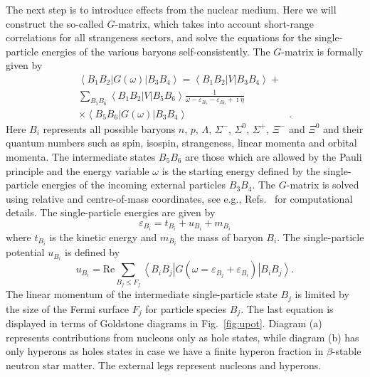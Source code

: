 \begin{multicols}{2}
The next step is to introduce effects from the nuclear medium. 
Here we will construct the so-called $G$-matrix, which
takes into account short-range correlations for all strangeness
sectors, and solve the equations for the single-particle energies 
of the various baryons self-consistently.
The $G$-matrix is formally given by 
\begin{eqnarray}
   \left\langle B_1B_2\right |G(\omega)\left | B_3B_4 \right\rangle=
   \left\langle B_1B_2\right |V\left | B_3B_4 \right\rangle+&\nonumber\\
   \sum_{B_5B_6}\left\langle B_1B_2\right |V\left | B_5B_6 \right\rangle
   \frac{1}{\omega-\varepsilon_{B_5}-\varepsilon_{B_6}+ \imath\eta}&\nonumber\\
   \times\left\langle B_5B_6\right |G(\omega)\left | B_3B_4 \right\rangle&.
   \label{eq:gmatrix}
\end{eqnarray}
Here $B_i$ represents all possible baryons $n$, $p$, $\Lambda$, $\Sigma^{-}$,
$\Sigma^0$, $\Sigma^+$, $\Xi^-$ and $\Xi^0$ and their quantum numbers
such as spin, isospin, strangeness, linear momenta and orbital momenta.
The intermediate states $B_5B_6$ are those which are allowed by
the Pauli principle and the energy variable $\omega$ is the starting energy
defined by the single-particle energies 
of the incoming external particles $B_3B_4$.
The $G$-matrix is solved using relative and centre-of-mass coordinates,
see e.g., Refs.~\cite{sl99,isaac99} for computational details.
The single-particle energies are given by
\begin{equation}
      \varepsilon_{B_i}=t_{B_i} + u_{B_i} +m_{B_i}
       \label{eq:spenergy}
\end{equation} 
where $t_{B_i}$ is the kinetic energy and $m_{B_i}$ 
the mass of baryon ${B_i}$. The
single-particle potential $u_{B_i}$ is defined by  
\begin{equation} 
       u_{B_i}=\mathrm{Re} \sum_{B_j\leq F_j}
       \left\langle B_iB_j\right |
       G(\omega=\varepsilon_{B_j}+\varepsilon_{B_i})
       \left | B_iB_j \right\rangle.
\end{equation}
The linear momentum of the intermediate 
single-particle state $B_j$ is limited by the size of the Fermi surface 
$F_j$ for particle species $B_j$. 
The last equation is displayed in terms of Goldstone diagrams 
in Fig.\ \ref{fig:upot}. Diagram (a) represents contributions
from nucleons only as hole states, while diagram (b) 
has only hyperons as holes states in case we have a finite hyperon
fraction in $\beta$-stable neutron star matter. The external legs
represent nucleons and hyperons.  


\end{multicols}
